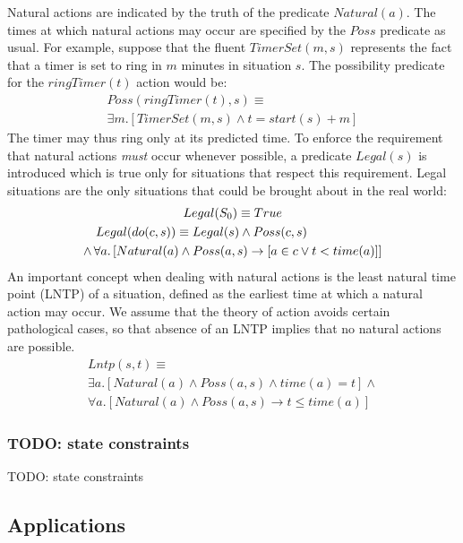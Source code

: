 Natural actions are indicated by the truth of the predicate $Natural(a)$.
The times at which natural actions may occur are specified by the
$Poss$ predicate as usual. For example, suppose that the fluent $TimerSet(m,s)$
represents the fact that a timer is set to ring in $m$ minutes in
situation $s$. The possibility predicate for the $ringTimer(t)$
action would be:\begin{multline*}
Poss(ringTimer(t),s)\equiv\\
\exists m.\left[TimerSet(m,s)\wedge t=start(s)+m\right]\end{multline*}
 The timer may thus ring only at its predicted time. To enforce the
requirement that natural actions \emph{must} occur whenever possible,
a predicate $Legal(s)$ is introduced which is true only for situations
that respect this requirement. Legal situations are the only situations
that could be brought about in the real world:\begin{multline*}
Legal(S_{0})\equiv True\\
\shoveleft{Legal(do(c,s))\equiv Legal(s)\wedge Poss(c,s)}\\
\wedge\,\forall a.\left[Natural(a)\wedge Poss(a,s)\rightarrow\left[a\in c\vee t<time(a)\right]\right]\end{multline*}
 An important concept when dealing with natural actions is the least
natural time point (LNTP) of a situation, defined as the earliest
time at which a natural action may occur. We assume that the theory
of action avoids certain pathological cases, so that absence of an
LNTP implies that no natural actions are possible.\begin{multline*}
Lntp(s,t)\equiv\\
\exists a.\left[Natural(a)\wedge Poss(a,s)\wedge time(a)=t\right]\wedge\\
\forall a.\left[Natural(a)\wedge Poss(a,s)\rightarrow t\leq time(a)\right]\end{multline*}



\subsubsection{TODO: state constraints}

TODO: state constraints\citep{Lin94-StateConstraints}


\subsection{Applications}

